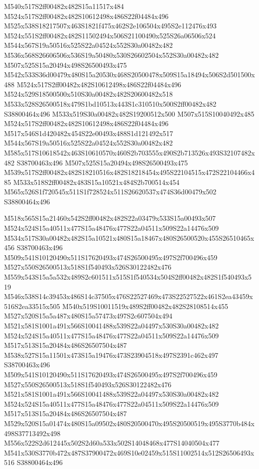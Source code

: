 \documentclass{article}
\begin{document}
\begin{multicols}{2}
M540x517S2ff00482x482S15a11517x484 M524x517S2ff00482x482S10612498x486S22f04484x496 M525x538S18217507x463S1821f475x462S2e106504x495S2e112476x493 M524x551S2ff00482x482S11502494x506S21100490x525S26a06506x524 M544x567S19a50516x525S22a04524x552S30a00482x482 M536x568S26606506x536S19a50480x530S26602504x552S30a00482x482 M507x525S15a20494x498S26500493x475 M542x533S36d00479x480S15a20530x468S20500478x509S15a18494x506S2d501500x488 M524x517S2ff00482x482S10612498x486S22f04484x496 M524x529S18500500x510S30a00482x482S20600482x518 M533x528S26500518x479S1bd10513x443S1c310510x500S2ff00482x482 S38800464x496 M533x519S30a00482x482S19200512x500 M507x515S10040492x485 M524x517S2ff00482x482S10612498x486S22f04484x496 M517x546S1d420482x454S22e00493x488S1d121492x517 M544x567S19a50516x525S22a04524x552S30a00482x482 M585x517S10618542x463S10610570x460S2b703555x490S2b713526x493S32107482x482 S38700463x496 M507x525S15a20494x498S26500493x475 M539x517S2ff00482x482S18210516x482S18218454x495S22104515x472S22104466x485 M533x518S2ff00482x483S15a10521x484S2b700514x454 M565x526S1f720545x511S1f728524x511S26620537x474S36d00479x502 S38800464x496

M518x565S15a21460x542S2ff00482x482S22a03479x533S15a00493x507 M524x524S15a40511x477S15a48476x477S22a04511x509S22a14476x509 M534x517S30a00482x482S15a10521x480S15a18467x480S26500520x455S26510465x456 S38700463x496 M509x541S10120490x511S17620493x474S26500495x497S2f700496x459 M527x550S26500513x518S1f540493x526S30122482x476 M559x543S15a5a532x489S2c601511x515S1f540534x504S2ff00482x482S1f540493x519 M546x538S14c39453x486S14c37505x476S22527469x473S22527522x461S2ea43459x516S2ea33515x505 M540x519S10011519x489S2ff00482x482S28108514x455 M527x520S15a5a487x480S15a57473x497S2c607504x494 M521x581S1001a491x566S10041488x539S22a04497x530S30a00482x482 M524x524S15a40511x477S15a48476x477S22a04511x509S22a14476x509 M517x513S15a20484x486S26507504x487 M538x527S15a11501x473S15a19476x473S23904518x497S2391c462x497 S38700463x496 M509x541S10120490x511S17620493x474S26500495x497S2f700496x459 M527x550S26500513x518S1f540493x526S30122482x476 M521x581S1001a491x566S10041488x539S22a04497x530S30a00482x482 M524x524S15a40511x477S15a48476x477S22a04511x509S22a14476x509 M517x513S15a20484x486S26507504x487 M529x520S15a01474x480S15a09502x480S20500470x495S20500519x495S3770b484x498S37713492x498 M556x522S2d612445x502S2d60a533x502S14048468x477S14040504x477 M541x530S3770b472x487S37900472x469S10e02459x515S11002514x512S26506493x516 S38800464x496


\end{multicols}
\end{document}
